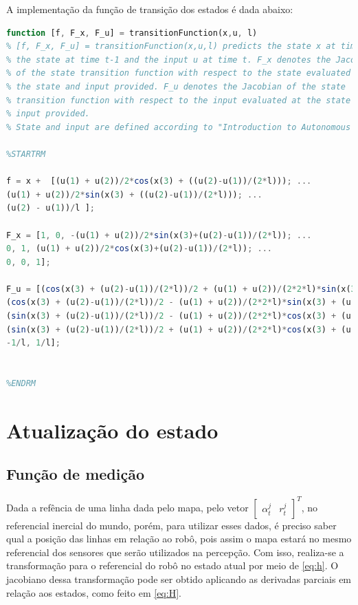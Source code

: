 \clearpage

A implementação da função de transição dos estados é dada abaixo:

\begin{lstlisting}[language=Octave]
function [f, F_x, F_u] = transitionFunction(x,u, l)
% [f, F_x, F_u] = transitionFunction(x,u,l) predicts the state x at time t given
% the state at time t-1 and the input u at time t. F_x denotes the Jacobian
% of the state transition function with respect to the state evaluated at
% the state and input provided. F_u denotes the Jacobian of the state
% transition function with respect to the input evaluated at the state and
% input provided.
% State and input are defined according to "Introduction to Autonomous Mobile Robots", pp. 337

%STARTRM

f = x +  [(u(1) + u(2))/2*cos(x(3) + ((u(2)-u(1))/(2*l))); ...
(u(1) + u(2))/2*sin(x(3) + ((u(2)-u(1))/(2*l))); ...
(u(2) - u(1))/l ];

F_x = [1, 0, -(u(1) + u(2))/2*sin(x(3)+(u(2)-u(1))/(2*l)); ...
0, 1, (u(1) + u(2))/2*cos(x(3)+(u(2)-u(1))/(2*l)); ...
0, 0, 1];

F_u = [(cos(x(3) + (u(2)-u(1))/(2*l))/2 + (u(1) + u(2))/(2*2*l)*sin(x(3) + (u(2)-u(1))/(2*l))), ...
(cos(x(3) + (u(2)-u(1))/(2*l))/2 - (u(1) + u(2))/(2*2*l)*sin(x(3) + (u(2)-u(1))/(2*l))); ...
(sin(x(3) + (u(2)-u(1))/(2*l))/2 - (u(1) + u(2))/(2*2*l)*cos(x(3) + (u(2)-u(1))/(2*l))), ...
(sin(x(3) + (u(2)-u(1))/(2*l))/2 + (u(1) + u(2))/(2*2*l)*cos(x(3) + (u(2)-u(1))/(2*l))); ...
-1/l, 1/l];    


%ENDRM

\end{lstlisting}



\clearpage

\section{Atualização do estado}

\subsection{Função de medição}

Dada a refência de uma linha dada pelo mapa, pelo vetor $\begin{bmatrix} \alpha_t^j & r_t^j \end{bmatrix}^T$, no referencial inercial do mundo, porém, para utilizar esses dados, é preciso saber qual a posição das linhas em relação ao robô, pois assim o mapa estará no mesmo referencial dos sensores que serão utilizados na percepção. Com isso, realiza-se a transformação para o referencial do robô no estado atual por meio de \eqref{eq:h}. O jacobiano dessa transformação pode ser obtido aplicando as derivadas parciais em relação aos estados, como feito em \eqref{eq:H}.

